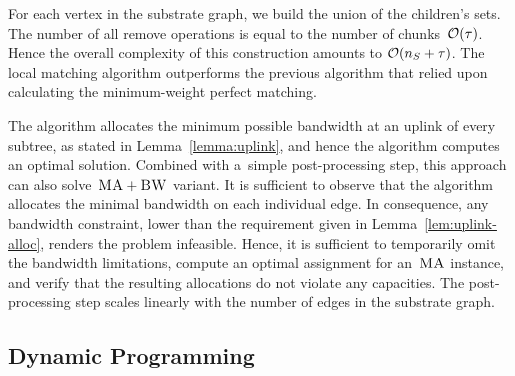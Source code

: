  For each
vertex in the substrate graph,
we build the union of the
children's sets.
The number of all remove operations is equal to
the number of chunks~$\mathcal{O}(\tau)$.
Hence the overall complexity of this construction amounts to
$\mathcal{O}(n_S + \tau)$.
The local matching algorithm outperforms the previous algorithm that relied upon calculating the minimum-weight perfect matching.


%

The algorithm allocates the minimum possible bandwidth at an uplink of every subtree, as stated in Lemma~\ref{lemma:uplink}, and hence the algorithm computes an optimal solution.
Combined with a~simple post-processing step, this approach can also solve~$\textsc{MA}+\textsc{BW}$ variant.
It is sufficient to observe
that the algorithm allocates the minimal bandwidth
on each individual edge. In consequence, any bandwidth constraint,
lower than the requirement given in Lemma~\ref{lem:uplink-alloc}, renders
the problem infeasible. Hence, it is sufficient to temporarily omit the
bandwidth limitations, compute an optimal assignment for an~$\textsc{MA}$ instance, and
verify that the resulting allocations do not violate any capacities. The
post-processing step scales linearly with the number of edges in the substrate
graph.


\subsection{Dynamic Programming}\label{ssec:dyn}

